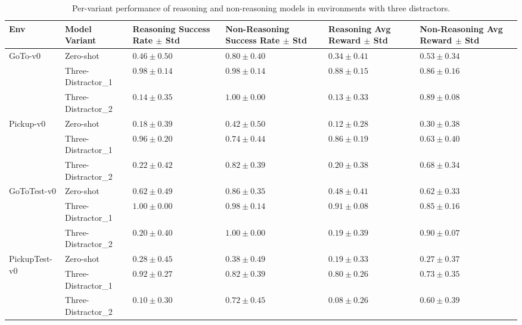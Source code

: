 \documentclass[11pt,a4paper]{article}
\begin{document}
\begin{table}[t]
\centering
\scriptsize
\begin{tabularx}{\linewidth}{%
    l l
    >{\centering\arraybackslash}X 
    >{\centering\arraybackslash}X 
    >{\centering\arraybackslash}X 
    >{\centering\arraybackslash}X }
\toprule
\textbf{Env} & \textbf{Model Variant} 
& \textbf{Reasoning Success Rate $\pm$ Std} 
& \textbf{Non-Reasoning Success Rate $\pm$ Std} 
& \textbf{Reasoning Avg Reward $\pm$ Std} 
& \textbf{Non-Reasoning Avg Reward $\pm$ Std} \\
\midrule
\multirow{3}{*}{GoTo-v0} 
    & Zero-shot                & $0.46\pm0.50$ & $0.80\pm0.40$ & $0.34\pm0.41$ & $0.53\pm0.34$ \\
    & Three-Distractor\_1     & $0.98\pm0.14$ & $0.98\pm0.14$ & $0.88\pm0.15$ & $0.86\pm0.16$ \\
    & Three-Distractor\_2     & $0.14\pm0.35$ & $1.00\pm0.00$ & $0.13\pm0.33$ & $0.89\pm0.08$ \\
\midrule
\multirow{3}{*}{Pickup-v0} 
    & Zero-shot                & $0.18\pm0.39$ & $0.42\pm0.50$ & $0.12\pm0.28$ & $0.30\pm0.38$ \\
    & Three-Distractor\_1     & $0.96\pm0.20$ & $0.74\pm0.44$ & $0.86\pm0.19$ & $0.63\pm0.40$ \\
    & Three-Distractor\_2     & $0.22\pm0.42$ & $0.82\pm0.39$ & $0.20\pm0.38$ & $0.68\pm0.34$ \\
\midrule
\multirow{3}{*}{GoToTest-v0} 
    & Zero-shot                & $0.62\pm0.49$ & $0.86\pm0.35$ & $0.48\pm0.41$ & $0.62\pm0.33$ \\
    & Three-Distractor\_1     & $1.00\pm0.00$ & $0.98\pm0.14$ & $0.91\pm0.08$ & $0.85\pm0.16$ \\
    & Three-Distractor\_2     & $0.20\pm0.40$ & $1.00\pm0.00$ & $0.19\pm0.39$ & $0.90\pm0.07$ \\
\midrule
\multirow{3}{*}{PickupTest-v0} 
    & Zero-shot                & $0.28\pm0.45$ & $0.38\pm0.49$ & $0.19\pm0.33$ & $0.27\pm0.37$ \\
    & Three-Distractor\_1     & $0.92\pm0.27$ & $0.82\pm0.39$ & $0.80\pm0.26$ & $0.73\pm0.35$ \\
    & Three-Distractor\_2     & $0.10\pm0.30$ & $0.72\pm0.45$ & $0.08\pm0.26$ & $0.60\pm0.39$ \\
\bottomrule
\end{tabularx}
\caption{Per-variant performance of reasoning and non-reasoning models in environments with three distractors.}
\label{tab:performance3}
\end{table}
\end{document}
